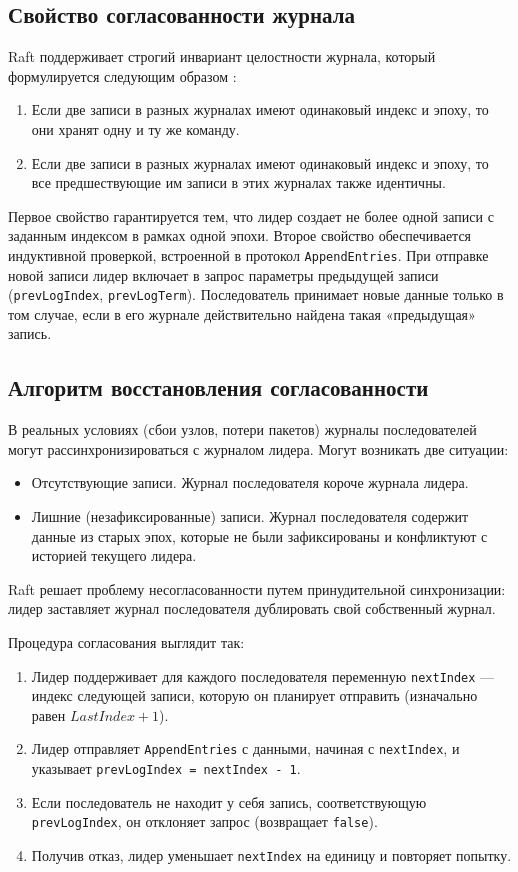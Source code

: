 \subsection{Свойство согласованности журнала}

Raft поддерживает строгий инвариант целостности журнала, который формулируется следующим образом \cite{raft_original}:
\begin{enumerate}
    \item Если две записи в разных журналах имеют одинаковый индекс и эпоху, то они хранят одну и ту же команду.
    \item Если две записи в разных журналах имеют одинаковый индекс и эпоху, то все предшествующие им записи в этих журналах также идентичны.
\end{enumerate}

Первое свойство гарантируется тем, что лидер создает не более одной записи с заданным индексом в рамках одной эпохи.
Второе свойство обеспечивается индуктивной проверкой, встроенной в протокол \texttt{AppendEntries}. При отправке новой записи лидер включает в запрос параметры предыдущей записи (\texttt{prevLogIndex}, \texttt{prevLogTerm}). Последователь принимает новые данные только в том случае, если в его журнале действительно найдена такая «предыдущая» запись.

\subsection{Алгоритм восстановления согласованности}

В реальных условиях (сбои узлов, потери пакетов) журналы последователей могут рассинхронизироваться с журналом лидера. Могут возникать две ситуации:
\begin{itemize}
    \item Отсутствующие записи. Журнал последователя короче журнала лидера.
    \item Лишние (незафиксированные) записи. Журнал последователя содержит данные из старых эпох, которые не были зафиксированы и конфликтуют с историей текущего лидера.
\end{itemize}

Raft решает проблему несогласованности путем принудительной синхронизации: лидер заставляет журнал последователя дублировать свой собственный журнал.

Процедура согласования выглядит так:
\begin{enumerate}
    \item Лидер поддерживает для каждого последователя переменную \texttt{nextIndex} — индекс следующей записи, которую он планирует отправить (изначально равен $LastIndex + 1$).
    \item Лидер отправляет \texttt{AppendEntries} с данными, начиная с \texttt{nextIndex}, и указывает \texttt{prevLogIndex = nextIndex - 1}.
    \item Если последователь не находит у себя запись, соответствующую \texttt{prevLogIndex}, он отклоняет запрос (возвращает \texttt{false}).
    \item Получив отказ, лидер уменьшает \texttt{nextIndex} на единицу и повторяет попытку.
\end{enumerate}

